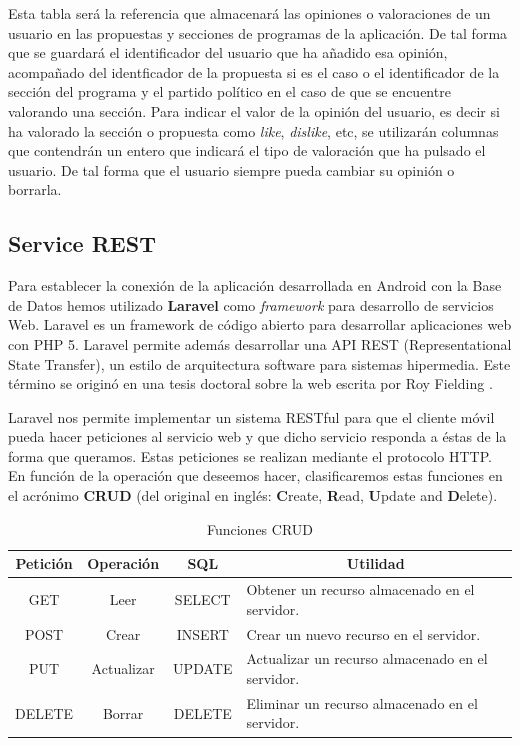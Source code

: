 Esta tabla será la referencia que almacenará las opiniones o valoraciones de un usuario en las propuestas y secciones de programas de la aplicación. De tal forma que se guardará el identificador del usuario que ha añadido esa opinión, acompañado del identficador de la propuesta si es el caso o el identificador de la sección del programa y el partido político en el caso de que se encuentre valorando una sección. Para indicar el valor de la opinión del usuario, es decir si ha valorado la sección o propuesta como \textit{like}, \textit{dislike}, etc, se utilizarán columnas que contendrán un entero que indicará el tipo de valoración que ha pulsado el usuario. De tal forma que el usuario siempre pueda cambiar su opinión o borrarla.

\subsection{Service REST} \label{ssec:seviceREST}

Para establecer la conexión de la aplicación desarrollada en Android con la Base de Datos hemos utilizado \textbf{Laravel} como \textit{framework} para desarrollo de servicios Web. Laravel \cite{ref:laravel} es un framework de código abierto para desarrollar aplicaciones web con PHP 5. Laravel permite además desarrollar una API REST (Representational State Transfer), un estilo de arquitectura software para sistemas hipermedia. Este término se originó en una tesis doctoral sobre la web escrita por Roy Fielding \cite{ref:RESTPhd}.

Laravel nos permite implementar un sistema RESTful para que el cliente móvil pueda hacer peticiones al servicio web y que dicho servicio responda a éstas de la forma que queramos. Estas peticiones se realizan mediante el protocolo HTTP. En función de la operación que deseemos hacer, clasificaremos estas funciones en el acrónimo \textbf{CRUD} \cite{ref:CRUD} (del original en inglés: \textbf{C}reate, \textbf{R}ead, \textbf{U}pdate and \textbf{D}elete).

\begin{table}[!]
\begin{tabular}{|c|c|c|m{6.25cm}|}
\hline
{\bf Petición} & {\bf Operación} & {\bf SQL} & \multicolumn{1}{c|}{{\bf Utilidad}}              \\ \hline
GET            & Leer            & SELECT    & Obtener un recurso almacenado en el servidor.    \\ \hline
POST           & Crear           & INSERT    & Crear un nuevo recurso en el servidor.           \\ \hline
PUT            & Actualizar      & UPDATE    & Actualizar un recurso almacenado en el servidor. \\ \hline
DELETE         & Borrar          & DELETE    & Eliminar un recurso almacenado en el servidor.   \\ \hline
\end{tabular}
\caption{Funciones CRUD}
\label{fig:CRUDtable}
\end{table}

